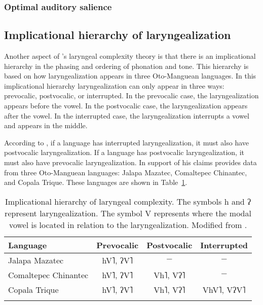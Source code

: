 \subsubsection{Optimal auditory salience}\label{sec:optimal_auditory_salience}


\subsection{Implicational hierarchy of laryngealization}\label{sec:implicational_hierarchy}

Another aspect of \citeauthor{silvermanLaryngealComplexityOtomanguean1997}'s \citeyear{silvermanLaryngealComplexityOtomanguean1997} laryngeal complexity theory is that there is an implicational hierarchy in the phasing and ordering of phonation and tone. This hierarchy is based on how laryngealization appears in three Oto-Manguean languages. In this implicational hierarchy laryngealization can only appear in three ways: prevocalic, postvocalic, or interrupted. In the prevocalic case, the laryngealization appears before the vowel. In the postvocalic case, the laryngealization appears after the vowel. In the interrupted case, the laryngealization interrupts a vowel and appears in the middle.

According to \citet{silvermanLaryngealComplexityOtomanguean1997}, if a language has interrupted laryngealization, it must also have postvocalic laryngealization. If a language has postvocalic laryngealization, it must also have prevocalic laryngealization. In support of his claims \citet{silvermanLaryngealComplexityOtomanguean1997} provides data from three Oto-Manguean languages: Jalapa Mazatec, Comaltepec Chinantec, and Copala Trique. These languages are shown in Table~\ref{tab:implicational_hierarchy}.

\begin{table}[h!]
    \centering
    \caption{Implicational hierarchy of laryngeal complexity. The symbols h and ʔ represent laryngealization. The symbol V represents where the modal vowel is located in relation to the laryngealization.  Modified from \citet{silvermanLaryngealComplexityOtomanguean1997}.} 
    \label{tab:implicational_hierarchy}
    \begin{tabular}{lccc}
        \lsptoprule
        \textbf{Language} & \textbf{Prevocalic} & \textbf{Postvocalic} & \textbf{Interrupted} \\
        \hline 
        Jalapa Mazatec & hV˥, ʔV˥ & $-$ & $-$ \\
        Comaltepec Chinantec & hV˥, ʔV˥ & Vh˥, Vʔ˥ & $-$ \\
        Copala Trique & hV˥, ʔV˥ & Vh˥, Vʔ˥ & VhV˥, VʔV˥ \\
        \lspbottomrule
    \end{tabular}
\end{table}

